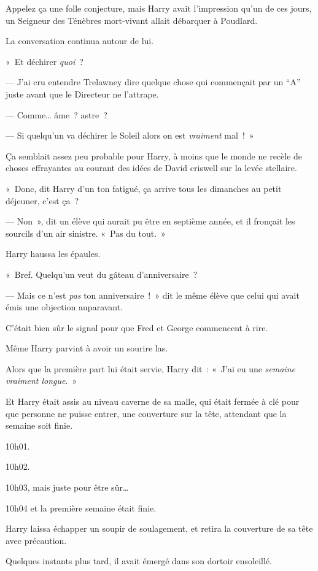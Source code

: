 Appelez ça une folle conjecture, mais Harry avait l'impression qu'un de ces jours, un Seigneur des Ténèbres mort-vivant allait débarquer à Poudlard.

La conversation continua autour de lui.

«~Et déchirer \emph{quoi}~?

--- J'ai cru entendre Trelawney dire quelque chose qui commençait par un “A” juste avant que le Directeur ne l'attrape.

--- Comme… âme~? astre~?

--- Si quelqu'un va déchirer le Soleil alors on est \emph{vraiment} mal~!~»

Ça semblait assez peu probable pour Harry, à moins que le monde ne recèle de choses effrayantes au courant des idées de David criswell sur la levée stellaire.

«~Donc, dit Harry d'un ton fatigué, ça arrive tous les dimanches au petit déjeuner, c'est ça~?

--- Non~», dit un élève qui aurait pu être en septième année, et il fronçait les sourcils d'un air sinistre. «~Pas du tout.~»

Harry haussa les épaules.

«~Bref. Quelqu'un veut du gâteau d'anniversaire~?

--- Mais ce n'est \emph{pas} ton anniversaire~!~» dit le même élève que celui qui avait émis une objection auparavant.

C'était bien sûr le signal pour que Fred et George commencent à rire.

Même Harry parvint à avoir un sourire las.

Alors que la première part lui était servie, Harry dit~: «~J'ai eu une \emph{semaine vraiment longue}.~»

\later

Et Harry était assis au niveau caverne de sa malle, qui était fermée à clé pour que personne ne puisse entrer, une couverture sur la tête, attendant que la semaine soit finie.

10h01.

10h02.

10h03, mais juste pour être sûr…

10h04 et la première semaine était finie.

Harry laissa échapper un soupir de soulagement, et retira la couverture de sa tête avec précaution.

Quelques instants plus tard, il avait émergé dans son dortoir ensoleillé.

